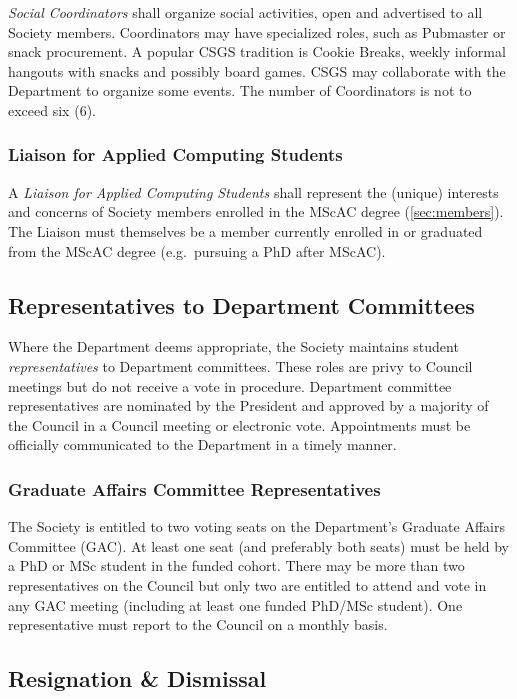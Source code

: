 \textit{Social Coordinators} shall organize social activities, open and advertised to all Society members. Coordinators may have specialized roles, such as Pubmaster or snack procurement. A popular CSGS tradition is Cookie Breaks, weekly informal hangouts with snacks and possibly board games. CSGS may collaborate with the Department to organize some events. The number of Coordinators is not to exceed six ($6$).

\subsubsection{Liaison for Applied Computing Students}

A \textit{Liaison for Applied Computing Students} shall represent the (unique)
interests and concerns of Society members enrolled in the MScAC degree
(\ref{sec:members}). The Liaison must themselves be a member currently enrolled
in or graduated from the MScAC degree (e.g.\ pursuing a PhD after MScAC).

\subsection{Representatives to Department Committees}\label{sec:representatives}

Where the Department deems appropriate, the Society maintains student
\textit{representatives} to Department committees. These roles are privy to
Council meetings but do not receive a vote in procedure. Department committee
representatives are nominated by the President and approved by a majority of
the Council in a Council meeting or electronic vote. Appointments must be
officially communicated to the Department in a timely manner.

\subsubsection{Graduate Affairs Committee Representatives}

The Society is entitled to two voting seats on the Department's Graduate
Affairs Committee (GAC). At least one seat (and preferably both seats) must be
held by a PhD or MSc student in the funded cohort. There may be more than two
representatives on the Council but only two are entitled to attend and vote in
any GAC meeting (including at least one funded PhD/MSc student). One
representative must report to the Council on a monthly basis.

\subsection{Resignation \& Dismissal}


